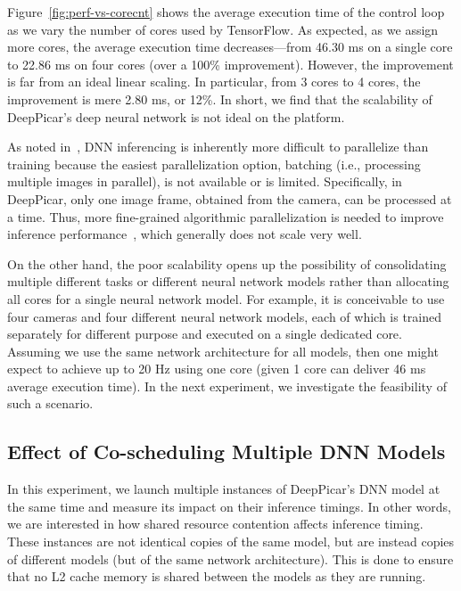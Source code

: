 Figure~\ref{fig:perf-vs-corecnt} shows the average execution time of
the control loop as we vary the number of cores used by
TensorFlow. As expected, as we assign more cores, the average execution
time decreases---from 46.30 ms on a single core to 22.86 ms on four
cores (over a 100\% improvement). However, the improvement is far from an ideal
linear scaling. In particular, from 3 cores to 4 cores, the
improvement is mere 2.80 ms, or 12\%. In short, we find that the
scalability of DeepPicar's deep neural network is not ideal on the
platform.

As noted in~\cite{NVIDIA2015}, DNN inferencing is inherently more
difficult to parallelize than training because the easiest
parallelization option, batching (i.e., processing multiple images in
parallel), is not available or is limited. Specifically, in DeepPicar,
only one image frame, obtained from the camera, can be processed at a
time. Thus, more fine-grained algorithmic parallelization is needed to
improve inference performance~\cite{NVIDIA2015}, which generally does
not scale very well. 

On the other hand, the poor scalability opens up the possibility of
consolidating multiple different tasks or different neural network
models rather than allocating all cores for a single neural network
model.
For example, it is conceivable to use four cameras and four different
neural network models, each of which is trained separately for
different purpose and executed on a single dedicated core.
Assuming we use the same network
architecture for all models, then one might expect to achieve up to
20 Hz using one core (given 1 core can deliver 46 ms average
execution time).
In the next experiment, we investigate the
feasibility of such a scenario.

\subsection{Effect of Co-scheduling Multiple DNN Models}

In this experiment, we launch multiple instances of DeepPicar's DNN
model at the same time and measure its impact on their inference
timings. In other words, we are interested in how shared resource
contention affects inference timing. These instances are not identical
copies of the same model, but are instead copies of different models
(but of the same network architecture). 
This is done to ensure that no L2 cache memory is shared between the 
models as they are running.

